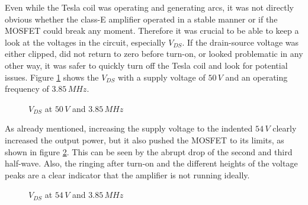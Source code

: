 \newpage
Even while the Tesla coil was operating and generating arcs, it was not directly obvious whether the class-E amplifier operated in a stable manner or if the MOSFET could break any moment. Therefore it was crucial to be able to keep a look at the voltages in the circuit, especially \(V_{DS}\). If the drain-source voltage was either clipped, did not return to zero before turn-on, or looked problematic in any other way, it was safer to quickly turn off the Tesla coil and look for potential issues. Figure \ref{fig:vds-50} shows the \(V_{DS}\) with a supply voltage of \(50\,V\) and an operating frequency of \(3.85\,MHz\).

\begin{figure}[h!]
    \centering
    \caption{\(V_{DS}\) at \(50\,V\) and \(3.85\,MHz\)}
    \label{fig:vds-50}
\end{figure}

As already mentioned, increasing the supply voltage to the indented \(54\,V\) clearly increased the output power, but it also pushed the MOSFET to its limits, as shown in figure \ref{fig:vds-54}. This can be seen by the abrupt drop of the second and third half-wave. Also, the ringing after turn-on and the different heights of the voltage peaks are a clear indicator that the amplifier is not running ideally.

\begin{figure}[h!]
    \centering
    \caption{\(V_{DS}\) at \(54\,V\) and \(3.85\,MHz\)}
    \label{fig:vds-54}
\end{figure}

